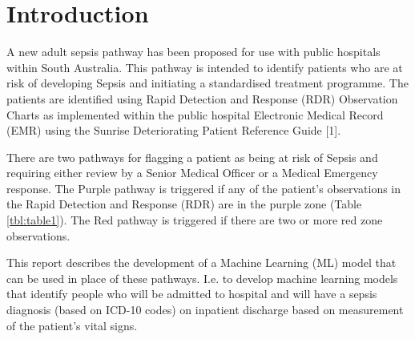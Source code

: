 \documentclass[
  a4paper,
  ,captions=tableheading
]{scrartcl}
\begin{document}
\pagebreak

\section{Introduction}\label{introduction}

A new adult sepsis pathway has been proposed for use with public
hospitals within South Australia. This pathway is intended to identify
patients who are at risk of developing Sepsis and initiating a
standardised treatment programme. The patients are identified using
Rapid Detection and Response (RDR) Observation Charts as implemented
within the public hospital Electronic Medical Record (EMR) using the
Sunrise Deteriorating Patient Reference Guide {[}1{]}.

There are two pathways for flagging a patient as being at risk of Sepsis
and requiring either review by a Senior Medical Officer or a Medical
Emergency response. The Purple pathway is triggered if any of the
patient's observations in the Rapid Detection and Response (RDR) are in
the purple zone (Table \ref{tbl:table1}). The Red pathway is triggered
if there are two or more red zone observations.

This report describes the development of a Machine Learning (ML) model
that can be used in place of these pathways. I.e. to develop machine
learning models that identify people who will be admitted to hospital
and will have a sepsis diagnosis (based on ICD-10 codes) on inpatient
discharge based on measurement of the patient's vital signs.
\end{document}
